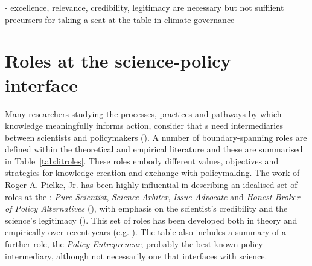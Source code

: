 \cite{IbarraJOBCIMRS2022} - excellence, relevance, credibility, legitimacy are necessary but not suffiient precursers for taking a seat at the table in climate governance



\section{Roles at the science-policy interface}\label{sec:litroles}

Many researchers studying the processes, practices and pathways by which knowledge meaningfully informs action, consider that \SPI s need intermediaries between scientists and policymakers (\cite{JagannathanEtAl2023}). A number of boundary-spanning roles are defined within the theoretical and empirical literature and these are summarised in Table~\ref{tab:litroles}. These roles embody different values, objectives and strategies for knowledge creation and exchange with policymaking. The work of Roger A. Pielke, Jr. has been highly influential in describing an idealised set of roles at the \SPI: \emph{Pure Scientist}, \emph{Science Arbiter}, \emph{Issue Advocate} and \emph{Honest Broker of Policy Alternatives} (\cite{Pielke2007}), with emphasis on the scientist's credibility and the science's legitimacy (\cite{DuncanRE2020}). This set of roles has been developed both in theory and empirically over recent years (e.g. \cite{RapleyD2014,DuncanRE2020,GluckmanBK2021,GregoryBW2024}). The table also includes a summary of a further role, the \emph{Policy Entrepreneur}, probably the best known policy intermediary, although not necessarily one that interfaces with science.

